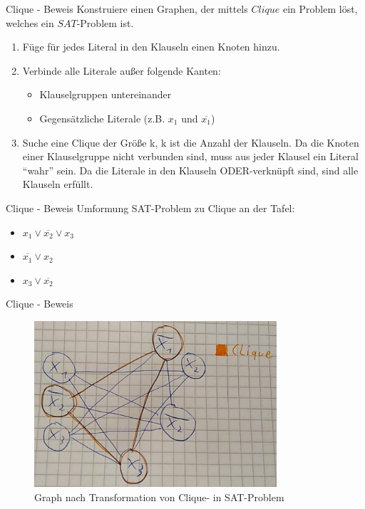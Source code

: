 \documentclass[12pt,donthandout,notes=dontshow,xcolor=table]{beamer}
\begin{document}
\begin{frame}{Clique - Beweis}
Konstruiere einen Graphen, der mittels \(Clique\) ein Problem löst, welches ein \(SAT\)-Problem ist.
\begin{enumerate}
\item Füge für jedes Literal in den Klauseln einen Knoten hinzu.
\pause
\item Verbinde alle Literale außer folgende Kanten:
\begin{itemize}
\item Klauselgruppen untereinander
\item Gegensätzliche Literale (z.B. \(x_1\) und \(\overline{x_1}\))
\end{itemize}
\pause
\item Suche eine Clique der Größe k, k ist die Anzahl der Klauseln. Da die Knoten einer Klauselgruppe nicht verbunden sind, muss aus jeder Klausel ein Literal ``wahr'' sein. Da die Literale in den Klauseln ODER-verknüpft sind, sind alle Klauseln erfüllt. \cite{weitz}
\end{enumerate}
\end{frame}

\begin{frame}{Clique - Beweis}
Umformung SAT-Problem zu Clique an der Tafel:
\begin{itemize}
\item \(x_1 \vee \overline{x_2} \vee x_3\)
\item \(\overline{x_1} \vee x_2\)
\item \(x_3 \vee \overline{x_2}\)

\end{itemize}
\end{frame}

\begin{frame}{Clique - Beweis}
\begin{figure}
\includegraphics[width=9cm]{figures/clique_sat}
\caption{Graph nach Transformation von Clique- in SAT-Problem}
\end{figure}
\end{frame}
\end{document}

